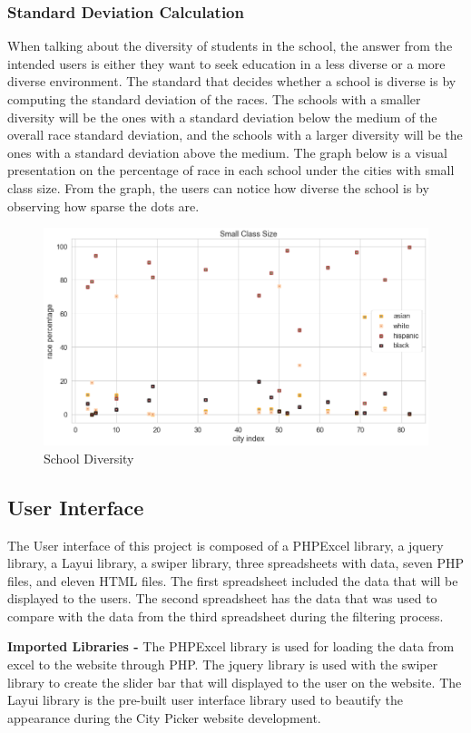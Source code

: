 \documentclass[10pt,twocolumn]{article}
\begin{document}
\subsubsection{Standard Deviation Calculation}
When talking about the diversity of students in the school, the answer from the intended users is either they want to seek education in a less diverse or a more diverse environment. The standard that decides whether a school is diverse is by computing the standard deviation of the races. The schools with a smaller diversity will be the ones with a standard deviation below the medium of the overall race standard deviation, and the schools with a larger diversity will be the ones with a standard deviation above the medium. The graph below is a visual presentation on the percentage of race in each school under the cities with small class size. From the graph, the users can notice how diverse the school is by observing how sparse the dots are.
\begin{figure}[h!]
    \centering
    \includegraphics[width=.95\linewidth]{small.png}
    \small
    \caption{School Diversity}
\end{figure}

\subsection{User Interface}
The User interface of this project is composed of a PHPExcel library, a jquery library, a Layui library, a swiper library, three spreadsheets with data, seven PHP files, and eleven HTML files. 
\newline
\indent
The first spreadsheet included the data that will be displayed to the users. The second spreadsheet has the data that was used to compare with the data from the third spreadsheet during the filtering process.

\textbf{Imported Libraries -}
The PHPExcel library is used for loading the data from excel to the website through PHP. The jquery library is used with the swiper library to create the slider bar that will displayed to the user on the website. The Layui library is the pre-built user interface library used to beautify the appearance during the City Picker website development.
\end{document}
